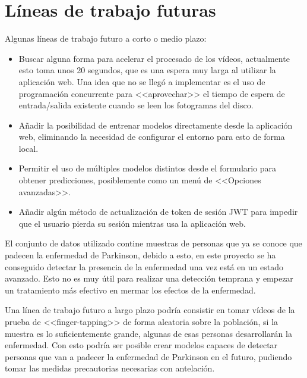\section{Líneas de trabajo futuras}

Algunas líneas de trabajo futuro a corto o medio plazo:

\begin{itemize}
    \item Buscar alguna forma para acelerar el procesado de los vídeos,
    actualmente esto toma unos 20 segundos, que es una espera muy larga al
    utilizar la aplicación web. Una idea que no se llegó a implementar es el uso
    de programación concurrente para <<aprovechar>> el tiempo de espera de
    entrada/salida existente cuando se leen los fotogramas del disco.
    \item Añadir la posibilidad de entrenar modelos directamente desde la
    aplicación web, eliminando la necesidad de configurar el entorno para esto
    de forma local.
    \item Permitir el uso de múltiples modelos distintos desde el formulario
    para obtener predicciones, posiblemente como un menú de <<Opciones
    avanzadas>>.
    \item Añadir algún método de actualización de token de sesión JWT para
    impedir que el usuario pierda su sesión mientras usa la aplicación web.
\end{itemize}

El conjunto de datos utilizado contine muestras de personas que ya se conoce que
padecen la enfermedad de Parkinson, debido a esto, en este proyecto se ha
conseguido detectar la presencia de la enfermedad una vez está en un estado
avanzado. Esto no es muy útil para realizar una detección temprana y empezar un
tratamiento más efectivo en mermar los efectos de la enfermedad.

Una línea de trabajo futuro a largo plazo podría consistir en tomar vídeos de la
prueba de <<finger-tapping>> de forma aleatoria sobre la población, si la
muestra es lo suficientemente grande, algunas de esas personas desarrollarán la
enfermedad. Con esto podría ser posible crear modelos capaces de detectar
personas que van a padecer la enfermedad de Parkinson en el futuro, pudiendo
tomar las medidas precautorias necesarias con antelación.
